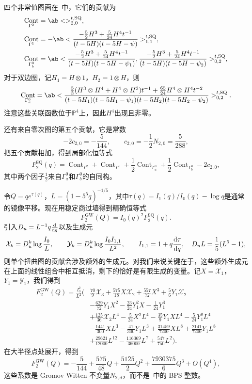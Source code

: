 \documentclass{amsart}
\theoremstyle{definition}
\theoremstyle{remark}
\theoremstyle{plain}
\theoremstyle{definition}
\theoremstyle{remark}
\renewcommand{\P}{\mathbb{P}}
\newcommand{\mc}[1]{\mathcal{#1}}
\newcommand{\mr}[1]{\mathrm{#1}}
\newcommand{\1}{\mathbf{1}}
\newcommand{\2}{\mathbf{2}}
\newcommand{\3}{\mathbf{3}}
\DeclareMathOperator{\Cont}{Cont}
\begin{document}
四个非常值图画在~中，它们的贡献为
\begin{align*}
    \Cont_{\Gamma^2} &= \ab<>^{t,\mr{SQ}}_{2,0}, \\
    \Cont_{\Gamma^1} &= -\ab< \frac{-\frac{5}{2}H^3 + \frac{5}{24}H^4t^{-1}}{(t-5H)(t-5H-\psi)}>^{t,\mr{SQ}}_{1,1}, \\
    \Cont_{\Gamma_b^0} &= \ab< \frac{-\frac{5}{2}H^3+\frac{5}{24}H^4t^{-1}}{(t-5H)(t-5H-\psi_1)}, \frac{-\frac{5}{2}H^3+\frac{5}{24}H^4t^{-1}}{(t-5H)(t-5H-\psi_2)}>^{t,\mr{SQ}}_{0,2},
\end{align*}
对于双边图，记\(H_1 = H \otimes 1\)，\(H_2 = 1 \otimes H\)，则
\[ \Cont_{\Gamma_a^0} = \ab< \frac{\frac{5}{3}(H^3\otimes H^4 + H^4 \otimes H^3)t^{-1} + \frac{65}{24}H^4 \otimes H^4 t^{-2}}{(t-5H_1)(t-5H_1-\psi_1)(t-5H_2)(t-5H_2-\psi_2)}>^{t,\mr{SQ}}_{0,2}. \]
注意这些关联函数位于\(\P^4\)上，因此\(H^4\)出现且非零。

还有来自零次图的第五个贡献，它是常数
\[ -2c_{2,0} = -\frac{5}{144}, \qquad c_{2,0} = -\frac{1}{2}N_{2,0} = \frac{5}{288}, \]
把五个贡献相加，得到局部化恒等式
\[ F_2^{\mr{SQ}}(q) = \Cont_{\Gamma^2} + \Cont_{\Gamma^1} + \frac{1}{2}\Cont_{\Gamma_a^0} + \frac{1}{2}\Cont_{\Gamma_b^0} - 2c_{2,0}, \]
其中两个因子\(\frac{1}{2}\)来自\(\Gamma_a^0\)和\(\Gamma_b^0\)的自同构。

令\(Q = qe^{\tau(q)}\)，\(L = (1-5^5q)^{-1/5}\)，其中\(\tau(q) = I_1(q)/I_0(q) - \log q\)是通常的镜像平移。现在用稳定商过墙得到精确恒等式
\[ F_2^{\mr{GW}}(Q) = I_0(q)^2 F_2^{\mr{SQ}}(q). \]
引入\(D_u = L^{-1}q\odv{}{q}\)以及生成元
\[ \mc{X}_k = D_u^k \log \frac{I_0}{L}, \qquad \mc{Y}_k = D_u^k \log \frac{I_0I_{1,1}}{L^2}, \qquad I_{1,1} = 1 + q \odv{\tau}{q}, \quad D_u L = \frac{1}{5}(L^5-1), \]
则单个扭曲图的贡献会涉及额外的生成元。对我们来说关键在于，这些额外生成元在上面的线性组合中相互抵消，剩下的恰好是有限生成的变量。记\(X = \mc{X}_1\)，\(Y_1 = \mc{Y}_1\)，我们得到
\begin{align*}
    F^{\mr{GW}}_2(Q) = \frac{I_0^2}{L^2}\Big(&\frac{70}{9}\mc{X}_3 + \frac{575}{18}X\mc{X}_2 + \frac{557}{72}X^3 + \frac{5}{6}Y_1\mc{X}_2 \\
    &- \frac{629}{72}Y_1X^2 - \frac{23}{24}Y_1^2 X - \frac{1}{24}Y_1^3 \\
    &+ \frac{125}{36}\mc{X}_2 L^4 - \frac{5}{24}X^2L^4 - \frac{35}{9}Y_1XL^4 - \frac{5}{24}Y_1^2L^4 \\
    &- \frac{1441}{300}XL^3 - \frac{41}{300}Y_1L^3 + \frac{31459}{7200}XL^8 + \frac{2141}{7200}Y_1L^8 \\
    &+ \frac{29621}{12000}L^{12} - \frac{116369}{36000}L^7 + \frac{547}{750}L^2\Big).
\end{align*}
在大半径点处展开，得到
\[ F_2^{\mr{GW}}(Q) = -\frac{5}{144} + \frac{575}{48}Q + \frac{5125}{2}Q^2 + \frac{7930375}{6}Q^3 + O(Q^4), \]
这些系数是 Gromov-Witten 不变量\(N_{2,d}\)，而不是~中的 BPS 整数。
\end{document}
